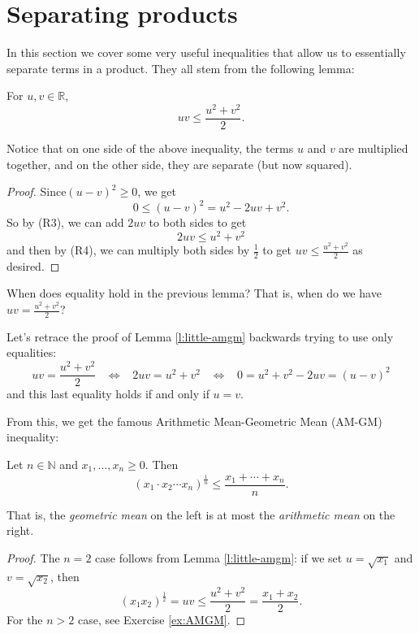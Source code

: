 \documentclass[11pt,dvipsnames]{book}
\numberwithin{equation}{section} %
\numberwithin{figure}{section} %
\numberwithin{table}{section} %
\begin{document}
\section{Separating products}

In this section we cover some very useful inequalities that allow us to essentially separate terms in a product. They all stem from the following lemma:

\begin{lemma}
\label{l:little-amgm}
For $u,v\in\mathbb{R}$,
\[uv \leq \frac{u^2+v^2}{2}.\]
\end{lemma}
Notice that on one side of the above inequality, the terms $u$ and $v$ are multiplied together, and on the other side, they are separate (but now squared). 

\begin{proof}
Since$(u-v)^2\geq 0$, we get
\[
0\leq (u-v)^2 =u^2-2uv + v^2.\]
So by (R3), we can add $2uv$ to both sides to get
\[
2uv \leq u^2+v^2\]
and then by (R4), we can multiply both sides by $\frac{1}{2}$ to get $uv \leq \frac{u^2+v^2}{2}$ as desired. 
\end{proof}


\begin{exercise}
\label{ex:uv=u^2+v^2/2}
When does equality hold in the previous lemma? That is, when do we have $uv = \frac{u^2+v^2}{2}$?
\end{exercise}

\begin{solution}
Let's retrace the proof of  Lemma \ref{l:little-amgm} backwards trying to use only equalities:
\[
uv = \frac{u^2+v^2}{2} \;\;\; \Longleftrightarrow \;\;\; 2uv = u^2+v^2
 \;\;\; \Longleftrightarrow \;\;\; 0=u^2+v^2-2uv = (u-v)^{2}
 \]
 and this last equality holds if and only if $u=v$. 
 \end{solution}
 
From this, we get the famous {Arithmetic Mean-Geometric Mean (AM-GM) inequality}:

\begin{theorem}[AM-GM Inequality]
\label{t:AM-GM}
Let $n\in\mathbb{N}$ and $x_{1},...,x_{n}\geq 0$. Then
\[
(x_{1}\cdot x_{2}\cdots x_{n})^{\frac{1}{n}}\leq \frac{x_{1}+\cdots + x_{n}}{n}.
\]
\end{theorem}
That is, the {\it geometric mean} on the left is at most the {\it arithmetic mean} on the right. 

\begin{proof}
The $n=2$ case follows from Lemma \ref{l:little-amgm}: if we set $u=\sqrt{x_{1}}$ and $v=\sqrt{x_{2}}$, then
\begin{equation}
\label{e:x1x2^1/2<x1+x2/2}
(x_{1}x_{2})^{\frac{1}{2}}=uv\leq \frac{u^2+v^2}{2} = \frac{x_{1}+x_{2}}{2}.
\end{equation}
For the $n>2$ case, see Exercise \ref{ex:AMGM}.
\end{proof}
\end{document}
